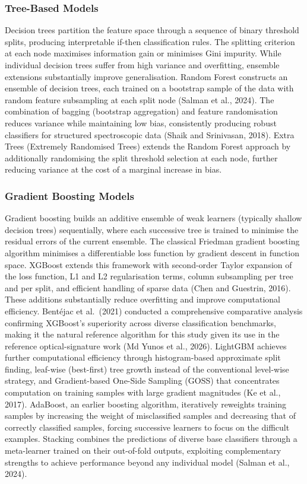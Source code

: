 \documentclass[12pt, oneside]{article} %
\begin{document}
\subsubsection{Tree-Based Models}

Decision trees partition the feature space through a sequence of binary threshold splits, producing interpretable if-then classification rules. The splitting criterion at each node maximises information gain or minimises Gini impurity. While individual decision trees suffer from high variance and overfitting, ensemble extensions substantially improve generalisation. Random Forest constructs an ensemble of decision trees, each trained on a bootstrap sample of the data with random feature subsampling at each split node (Salman et al., 2024). The combination of bagging (bootstrap aggregation) and feature randomisation reduces variance while maintaining low bias, consistently producing robust classifiers for structured spectroscopic data (Shaik and Srinivasan, 2018). Extra Trees (Extremely Randomised Trees) extends the Random Forest approach by additionally randomising the split threshold selection at each node, further reducing variance at the cost of a marginal increase in bias.


\subsubsection{Gradient Boosting Models}

Gradient boosting builds an additive ensemble of weak learners (typically shallow decision trees) sequentially, where each successive tree is trained to minimise the residual errors of the current ensemble. The classical Friedman gradient boosting algorithm minimises a differentiable loss function by gradient descent in function space. XGBoost extends this framework with second-order Taylor expansion of the loss function, L1 and L2 regularisation terms, column subsampling per tree and per split, and efficient handling of sparse data (Chen and Guestrin, 2016). These additions substantially reduce overfitting and improve computational efficiency. Bent\'{e}jac et al.\ (2021) conducted a comprehensive comparative analysis confirming XGBoost's superiority across diverse classification benchmarks, making it the natural reference algorithm for this study given its use in the reference optical-signature work (Md Yunos et al., 2026). LightGBM achieves further computational efficiency through histogram-based approximate split finding, leaf-wise (best-first) tree growth instead of the conventional level-wise strategy, and Gradient-based One-Side Sampling (GOSS) that concentrates computation on training samples with large gradient magnitudes (Ke et al., 2017). AdaBoost, an earlier boosting algorithm, iteratively reweights training samples by increasing the weight of misclassified samples and decreasing that of correctly classified samples, forcing successive learners to focus on the difficult examples. Stacking combines the predictions of diverse base classifiers through a meta-learner trained on their out-of-fold outputs, exploiting complementary strengths to achieve performance beyond any individual model (Salman et al., 2024).
\end{document}

